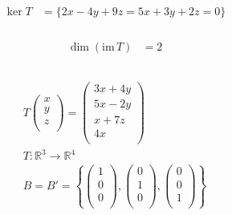 \documentclass[fleqn, a4paper, twocolumn, draft]{article}
\theoremstyle{definition}
\theoremstyle{theorem}
\theoremstyle{remark}
\newcommand{\im}{\mathrm{im}\,}
\numberwithin{corollary}{theorem}
\numberwithin{equation}{theorem}
\begin{document}
\begin{align*}
	\ker T &= \{2x - 4y + 9z = 5x + 3y + 2z = 0\}
\end{align*}

\subsubsection{}

\begin{align*}
	\dim (\im T) &= 2
\end{align*}

\subsection{}

\begin{gather*}
	T 
		\begin{pmatrix}
			x\\
			y\\
			z\\
		\end{pmatrix}
	=
		\begin{pmatrix}
			3x + 4y\\
			5x - 2y\\
			x + 7z\\
			4x\\
		\end{pmatrix}\\
	T : \mathbb{R}^3 \to \mathbb{R}^4\\
	B = B' = 
		\left\lbrace
			\begin{pmatrix}
				1\\
				0\\
				0\\
			\end{pmatrix}
		,
			\begin{pmatrix}
				0\\
				1\\
				0\\
			\end{pmatrix}
		,
			\begin{pmatrix}
				0\\
				0\\
				1\\
			\end{pmatrix}
		\right\rbrace
\end{gather*}

\subsubsection{}
\end{document}
